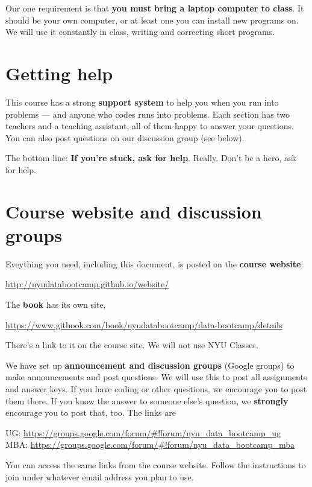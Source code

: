 \documentclass[11pt]{article}
\begin{document}
Our one requirement is that {\bf you must bring a laptop computer to class\/}.
It should be your own computer, or at least one you can install new programs on.
We will use it constantly in class, writing and correcting short programs.


\section*{Getting help}

This course has a strong {\bf support system\/} to help you when you run into problems ---
and anyone who codes runs into problems.
Each section has two teachers and a teaching assistant, all of them happy to answer your questions.
You can also post questions on our discussion group (see below).

The bottom line:  {\bf If you're stuck, ask for help\/}.
Really.  Don't be a hero, ask for help.



\section*{Course website and discussion groups}

Eveything you need, including this document, is posted on
the {\bf course website\/}:
%
\vspace{-0.15in}
\begin{center}
\url{http://nyudatabootcamp.github.io/website/}
\end{center}
\vspace{-0.15in}
%
The {\bf book\/} has its own site,
\vspace{-0.15in}
\begin{center}
\url{https://www.gitbook.com/book/nyudatabootcamp/data-bootcamp/details}
\end{center}
\vspace{-0.15in}
%
There's a link to it on the course site.
We will not use NYU Classes.

We have set up {\bf announcement and discussion groups\/} (Google groups)
to make announcements and post questions. We will use this to post all assignments and
answer keys.
If you have coding or other questions, we encourage you to post them there.
If you know the answer to someone else's question, we {\bf strongly } encourage you to post that, too.
The links are
\vspace{-0.1in}
\begin{center}
UG:   \url{https://groups.google.com/forum/#!forum/nyu_data_bootcamp_ug}  \\
MBA:  \url{https://groups.google.com/forum/#!forum/nyu_data_bootcamp_mba}
\end{center}
\vspace{-0.1in}
%
You can access the same links from the course website.  Follow the instructions to join under whatever email address you plan to use.
\end{document}
